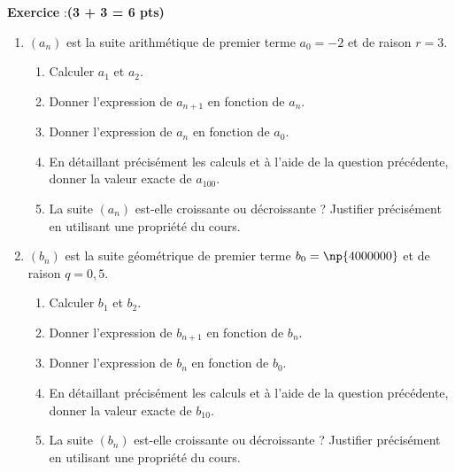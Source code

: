 \documentclass[10pt,french]{article}
\newcounter{exoc}
\newenvironment{exoc}[1]{%
  \refstepcounter{exoc}\textbf{Exercice \theexoc} :\hfill {\textbf{(#1)}}\par
  \medskip}%
{\medskip}
\begin{document}
\begin{exoc}{3 + 3 = 6 pts}
    \begin{enumerate}
        \item $(a_n)$ est la suite arithmétique de premier terme $a_0 = -2$ et de raison $r = 3$.
            \begin{enumerate}
                \item Calculer $a_1$ et $a_2$.
                \item Donner l'expression de $a_{n+1}$ en fonction de $a_n$.
                \item Donner l'expression de $a_n$ en fonction de $a_0$.
                \item En détaillant précisément les calculs et à l'aide de la question précédente, donner la valeur exacte de $a_{100}$.
                \item La suite $(a_n)$ est-elle croissante ou décroissante ? Justifier précisément en utilisant une propriété du cours.
            \end{enumerate}
        \item $(b_n)$ est la suite géométrique de premier terme $b_0 = \np{4000000}$ et de raison $q = 0,5$.
            \begin{enumerate}
                \item Calculer $b_1$ et $b_2$.
                \item Donner l'expression de $b_{n+1}$ en fonction de $b_n$.
                \item Donner l'expression de $b_n$ en fonction de $b_0$.
                \item En détaillant précisément les calculs et à l'aide de la question précédente, donner la valeur exacte de $b_{10}$.
                \item La suite $(b_n)$ est-elle croissante ou décroissante ? Justifier précisément en utilisant une propriété du cours.
            \end{enumerate}
    \end{enumerate}
\end{exoc}
\end{document}
